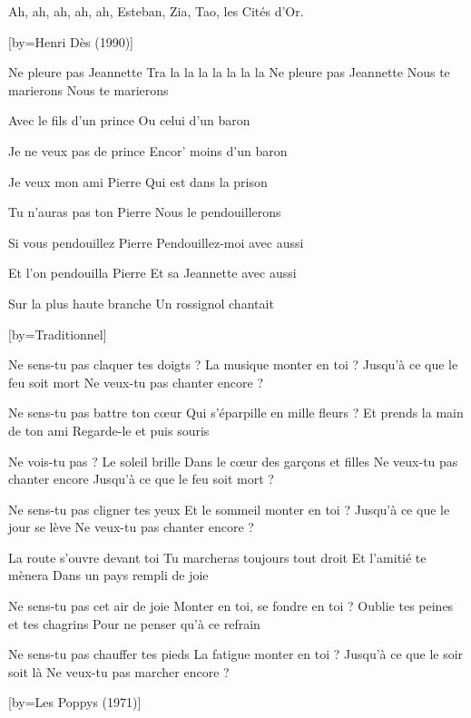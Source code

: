 \beginverse
Ah, ah, ah, ah, ah,
Esteban, Zia, Tao, les Cités d'Or.
\endverse

[by={Henri Dès (1990)}]

\beginverse
Ne pleure pas Jeannette
Tra la la la la la la la
Ne pleure pas Jeannette
Nous te marierons
Nous te marierons
\endverse

\beginverse
Avec le fils d'un prince
Ou celui d'un baron
\endverse

\beginverse
Je ne veux pas de prince
Encor’ moins d'un baron
\endverse

\beginverse
Je veux mon ami Pierre
Qui est dans la prison
\endverse

\beginverse
Tu n'auras pas ton Pierre
Nous le pendouillerons
\endverse

\beginverse
Si vous pendouillez Pierre
Pendouillez-moi avec aussi
\endverse

\beginverse
Et l'on pendouilla Pierre
Et sa Jeannette avec aussi
\endverse

\beginverse
Sur la plus haute branche
Un rossignol chantait
\endverse

[by={Traditionnel}]

\beginverse
Ne sens-tu pas claquer tes doigts ?
La musique monter en toi ?
Jusqu'à ce que le feu soit mort
Ne veux-tu pas chanter encore ?
\endverse

\beginverse
Ne sens-tu pas battre ton cœur
Qui s'éparpille en mille fleurs ?
Et prends la main de ton ami
Regarde-le et puis souris
\endverse

\beginverse
Ne vois-tu pas ? Le soleil brille
Dans le cœur des garçons et filles
Ne veux-tu pas chanter encore
Jusqu'à ce que le feu soit mort ?
\endverse

\beginverse
Ne sens-tu pas cligner tes yeux
Et le sommeil monter en toi ?
Jusqu'à ce que le jour se lève
Ne veux-tu pas chanter encore ?
\endverse

\beginverse
La route s'ouvre devant toi
Tu marcheras toujours tout droit
Et l'amitié te mènera
Dans un pays rempli de joie
\endverse

\beginverse
Ne sens-tu pas cet air de joie
Monter en toi, se fondre en toi ?
Oublie tes peines et tes chagrins
Pour ne penser qu'à ce refrain
\endverse

\beginverse
Ne sens-tu pas chauffer tes pieds
La fatigue monter en toi ?
Jusqu'à ce que le soir soit là
Ne veux-tu pas marcher encore ?
\endverse

[by={Les Poppys (1971)}]

